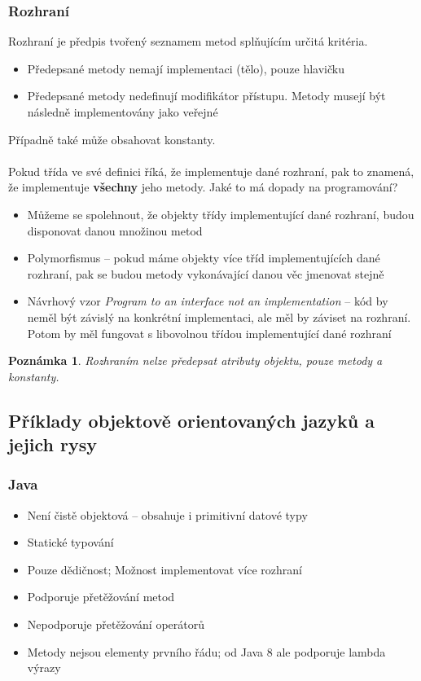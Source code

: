 \documentclass[10pt,a4paper]{article}
\newtheorem{note}{Poznámka}
\begin{document}
		\subsubsection{Rozhraní}
			\label{rozhrani}
			Rozhraní je předpis tvořený seznamem metod splňujícím určitá kritéria.
			\begin{itemize}
				\item{Předepsané metody nemají implementaci (tělo), pouze hlavičku}
				\item{Předepsané metody nedefinují modifikátor přístupu. Metody musejí být následně implementovány jako veřejné}
			\end{itemize}
			Případně také může obsahovat konstanty.
			\\
			\\
			Pokud třída ve své definici říká, že implementuje dané rozhraní, pak to znamená, že implementuje \textbf{všechny} jeho metody. Jaké to má dopady na programování?
			\begin{itemize}
				\item{Můžeme se spolehnout, že objekty třídy implementující dané rozhraní, budou disponovat danou množinou metod}
				\item{Polymorfismus -- pokud máme objekty více tříd implementujících dané rozhraní, pak se budou metody vykonávající danou věc jmenovat stejně}
				\item{Návrhový vzor \textit{Program to an interface not an implementation} -- kód by neměl být závislý na konkrétní implementaci, ale měl by záviset na rozhraní. Potom by měl fungovat s libovolnou třídou implementující dané rozhraní}
			\end{itemize}

			\begin{note}
				Rozhraním nelze předepsat atributy objektu, pouze metody a konstanty.
			\end{note}

	\subsection{Příklady objektově orientovaných jazyků a jejich rysy}
		\subsubsection{Java}
			\begin{itemize}
				\item{Není čistě objektová -- obsahuje i primitivní datové typy}
				\item{Statické typování}
				\item{Pouze  dědičnost; Možnost implementovat více rozhraní}
				\item{Podporuje přetěžování metod}
				\item{Nepodporuje přetěžování operátorů}
				\item{Metody nejsou elementy prvního řádu; od Java 8 ale podporuje lambda výrazy}
			\end{itemize}
\end{document}
